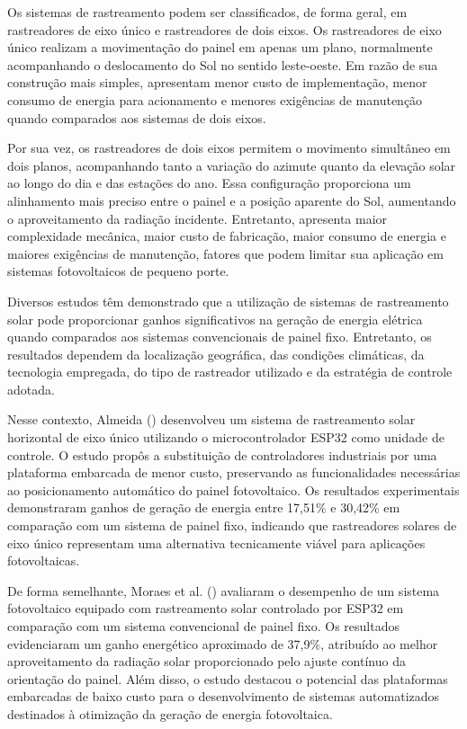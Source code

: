 Os sistemas de rastreamento podem ser classificados, de forma geral, em rastreadores de eixo único e rastreadores de dois eixos. Os rastreadores de eixo único realizam a movimentação do painel em apenas um plano, normalmente acompanhando o deslocamento do Sol no sentido leste-oeste. Em razão de sua construção mais simples, apresentam menor custo de implementação, menor consumo de energia para acionamento e menores exigências de manutenção quando comparados aos sistemas de dois eixos.

Por sua vez, os rastreadores de dois eixos permitem o movimento simultâneo em dois planos, acompanhando tanto a variação do azimute quanto da elevação solar ao longo do dia e das estações do ano. Essa configuração proporciona um alinhamento mais preciso entre o painel e a posição aparente do Sol, aumentando o aproveitamento da radiação incidente. Entretanto, apresenta maior complexidade mecânica, maior custo de fabricação, maior consumo de energia e maiores exigências de manutenção, fatores que podem limitar sua aplicação em sistemas fotovoltaicos de pequeno porte.

Diversos estudos têm demonstrado que a utilização de sistemas de rastreamento solar pode proporcionar ganhos significativos na geração de energia elétrica quando comparados aos sistemas convencionais de painel fixo. Entretanto, os resultados dependem da localização geográfica, das condições climáticas, da tecnologia empregada, do tipo de rastreador utilizado e da estratégia de controle adotada.

Nesse contexto, Almeida (\citeyear{almeida2024}) desenvolveu um sistema de rastreamento solar horizontal de eixo único utilizando o microcontrolador ESP32 como unidade de controle. O estudo propôs a substituição de controladores industriais por uma plataforma embarcada de menor custo, preservando as funcionalidades necessárias ao posicionamento automático do painel fotovoltaico. Os resultados experimentais demonstraram ganhos de geração de energia entre 17,51\% e 30,42\% em comparação com um sistema de painel fixo, indicando que rastreadores solares de eixo único representam uma alternativa tecnicamente viável para aplicações fotovoltaicas.

De forma semelhante, Moraes et al. (\citeyear{moraes2024}) avaliaram o desempenho de um sistema fotovoltaico equipado com rastreamento solar controlado por ESP32 em comparação com um sistema convencional de painel fixo. Os resultados evidenciaram um ganho energético aproximado de 37,9\%, atribuído ao melhor aproveitamento da radiação solar proporcionado pelo ajuste contínuo da orientação do painel. Além disso, o estudo destacou o potencial das plataformas embarcadas de baixo custo para o desenvolvimento de sistemas automatizados destinados à otimização da geração de energia fotovoltaica.

